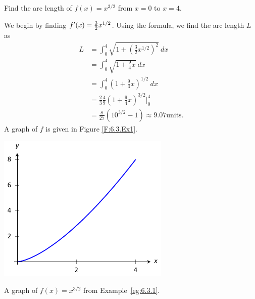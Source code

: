\begin{example} \label{eg:6.3.1} %
Find the arc length of $f(x) = x^{3/2}$ from $x=0$ to $x=4$. 

\solution
We begin by finding $f'(x)= \frac32x^{1/2}$. Using the formula, we find the arc length $L$ as
\begin{align*}
	L &=	\int_0^4 \sqrt{1+\left(\frac32x^{1/2}\right)^2}\ dx \\
		&=	\int_0^4 \sqrt{1+\frac94x} \ dx \\
		&= 	\int_0^4 \left(1+\frac94x\right)^{1/2}\ dx \\
		&=  \frac23\frac49\left(1+\frac94x\right)^{3/2}\Big|_0^4 \\
		&=\frac{8}{27}\left(10^{3/2}-1\right) \approx 9.07 \text{units}.
\end{align*}
A graph of $f$ is given in Figure \ref{F:6.3.Ex1}.
\end{example}

\begin{marginfigure}[-8cm] %
\includegraphics{figures/figarc1}
\caption{A graph of $f(x) = x^{3/2}$ from Example~\ref{eg:6.3.1}.} \label{F:6.3.Ex1}
\end{marginfigure}

